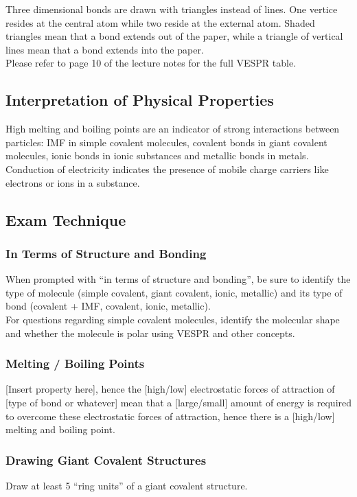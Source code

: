 \documentclass[../main]{subfiles}
\begin{document}
	Three dimensional bonds are drawn with triangles instead of lines. One vertice resides at the central atom while two reside at the external atom. Shaded triangles mean that a bond extends out of the paper, while a triangle of vertical lines mean that a bond extends into the paper. \\

	Please refer to page 10 of the lecture notes for the full VESPR table.

	\subsection{Interpretation of Physical Properties}

	High melting and boiling points are an indicator of strong interactions between particles: IMF in simple covalent molecules, covalent bonds in giant covalent molecules, ionic bonds in ionic substances and metallic bonds in metals. \\

	Conduction of electricity indicates the presence of mobile charge carriers like electrons or ions in a substance.

	\subsection{Exam Technique}


	\subsubsection{In Terms of Structure and Bonding}

	When prompted with ``in terms of structure and bonding'', be sure to identify the type of molecule (simple covalent, giant covalent, ionic, metallic) and its type of bond (covalent + IMF, covalent, ionic, metallic). \\

	For questions regarding simple covalent molecules, identify the molecular shape and whether the molecule is polar using VESPR and other concepts.

	\subsubsection{Melting / Boiling Points}

	[Insert property here], hence the [high/low] electrostatic forces of attraction of [type of bond or whatever] mean that a [large/small] amount of energy is required to overcome these electrostatic forces of attraction, hence there is a [high/low] melting and boiling point.

	\subsubsection{Drawing Giant Covalent Structures}

	Draw at least 5 ``ring units'' of a giant covalent structure.
\end{document}

